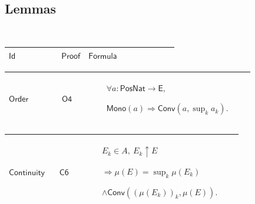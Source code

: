 \documentclass[12pt,reqno]{amsart}
\theoremstyle{blueplain}
\numberwithin{equation}{section}
\newlength{\DCTOneColumnBody}
\begin{document}
{\scriptsize \ }

\subsection{\protect\scriptsize Lemmas}

{\scriptsize {\ }}

{\scriptsize \setlength{\parskip}{0pt}\nointerlineskip
\noindent 
\begin{tabular}{|@{}>{\centering\arraybackslash}m{\DCTOneColumnBody}|}
\hline
$\displaystyle \mathsf{Lemmas}$ \\ \hline
\end{tabular}%
}

{\scriptsize \setlength{\parskip}{0pt}\nointerlineskip
\noindent 
\begin{tabular}{|@{}>{\centering\arraybackslash}m{0.19251\linewidth}|>{\centering\arraybackslash}m{0.16845\linewidth}|>{\centering\arraybackslash}m{0.53904\linewidth}|}
\hline
$\displaystyle \mathsf{Id}$ & $\displaystyle \mathsf{Proof}$ & $%
\displaystyle \mathsf{Formula}$ \\ \hline
\end{tabular}%
}

{\scriptsize \setlength{\parskip}{0pt}\nointerlineskip
\noindent 
\begin{tabular}{|@{}>{\centering\arraybackslash}m{0.19251\linewidth}|>{\centering\arraybackslash}m{0.16845\linewidth}|>{\centering\arraybackslash}m{0.53904\linewidth}|}
\hline
\hypertarget{lem:Order}{$\displaystyle \mathsf{Order}$} & \hyperlink{proof:O4}%
{$\displaystyle \mathsf{O4}$} & $\displaystyle \forall a:\mathsf{PosNat}\to%
\mathsf{E},$\par$\displaystyle \mathsf{Mono}(a)\Rightarrow\mathsf{Conv}%
(a,\sup_k a_k).$ \\ \hline
\end{tabular}%
}

{\scriptsize \setlength{\parskip}{0pt}\nointerlineskip
\noindent 
\begin{tabular}{|@{}>{\centering\arraybackslash}m{0.19251\linewidth}|>{\centering\arraybackslash}m{0.16845\linewidth}|>{\centering\arraybackslash}m{0.53904\linewidth}|}
\hline
\hypertarget{lem:Continuity}{$\displaystyle \mathsf{Continuity}$} & 
\hyperlink{proof:C6}{$\displaystyle \mathsf{C6}$} & $\displaystyle E_k\in
A,\ E_k\uparrow E$\par$\displaystyle \Rightarrow\mu(E)=\sup_k\mu(E_k)$\par$%
\displaystyle \land\mathsf{Conv}((\mu(E_k))_k,\mu(E)).$ \\ \hline
\end{tabular}%
}
\end{document}
